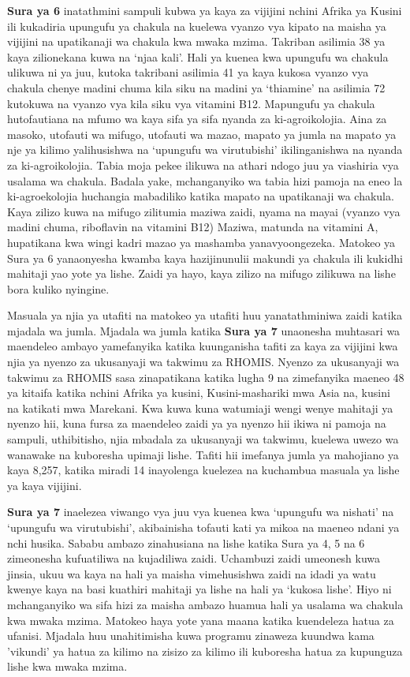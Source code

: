 \textbf{Sura ya 6} inatathmini sampuli kubwa ya kaya za vijijini nchini Afrika ya Kusini ili kukadiria upungufu ya chakula na kuelewa vyanzo vya kipato na maisha ya vijijini na upatikanaji wa chakula kwa mwaka mzima. Takriban asilimia 38 ya kaya zilionekana kuwa na `njaa kali'. Hali ya kuenea kwa upungufu wa chakula ulikuwa ni ya juu, kutoka takribani asilimia 41 ya kaya kukosa vyanzo vya chakula chenye madini chuma kila siku na madini ya `thiamine' na asilimia 72 kutokuwa na vyanzo vya kila siku vya vitamini B12. Mapungufu ya chakula hutofautiana na mfumo wa kaya sifa ya sifa nyanda za ki-agroikolojia. Aina za masoko, utofauti wa mifugo, utofauti wa mazao, mapato ya jumla na mapato ya nje ya kilimo yalihusishwa na `upungufu wa virutubishi' ikilinganishwa na nyanda za ki-agroikolojia. Tabia moja pekee ilikuwa na athari ndogo juu ya viashiria vya usalama wa chakula. Badala yake, mchanganyiko wa tabia hizi pamoja na eneo la ki-agroekolojia huchangia mabadiliko katika mapato na upatikanaji wa chakula. Kaya zilizo kuwa na mifugo zilitumia maziwa zaidi, nyama na mayai (vyanzo vya madini chuma, riboflavin na vitamini B12) Maziwa, matunda na vitamini A, hupatikana kwa wingi kadri mazao ya mashamba yanavyoongezeka. Matokeo ya Sura ya 6 yanaonyesha kwamba kaya hazijinunulii makundi ya chakula ili kukidhi mahitaji yao yote ya lishe. Zaidi ya hayo, kaya zilizo na mifugo zilikuwa na lishe bora kuliko nyingine.

Masuala ya njia ya utafiti na matokeo ya utafiti huu yanatathminiwa zaidi katika mjadala wa jumla. Mjadala wa jumla katika \textbf{Sura ya 7} unaonesha muhtasari wa maendeleo ambayo yamefanyika katika kuunganisha tafiti za kaya za vijijini kwa njia ya nyenzo za ukusanyaji wa takwimu za RHOMIS. Nyenzo za ukusanyaji wa takwimu za RHOMIS sasa zinapatikana katika lugha 9 na zimefanyika maeneo 48 ya kitaifa katika nchini Afrika ya kusini, Kusini-mashariki mwa Asia na, kusini na katikati mwa Marekani. Kwa kuwa kuna watumiaji wengi wenye mahitaji ya nyenzo hii, kuna fursa za maendeleo zaidi ya ya nyenzo hii ikiwa ni pamoja na sampuli, uthibitisho, njia mbadala za ukusanyaji wa takwimu, kuelewa uwezo wa wanawake na kuboresha upimaji lishe. Tafiti hii imefanya jumla ya mahojiano ya kaya 8,257, katika miradi 14 inayolenga kuelezea na kuchambua masuala ya lishe ya kaya vijijini. 

\textbf{Sura ya 7} inaelezea viwango vya juu vya kuenea kwa `upungufu wa nishati' na `upungufu wa virutubishi', akibainisha tofauti kati ya mikoa na maeneo ndani ya nchi husika. Sababu ambazo zinahusiana na lishe katika Sura ya 4, 5 na 6 zimeonesha kufuatiliwa na kujadiliwa zaidi. Uchambuzi zaidi umeonesh kuwa jinsia, ukuu wa kaya na hali ya maisha vimehusishwa zaidi na idadi ya watu kwenye kaya na basi kuathiri mahitaji ya lishe na hali ya `kukosa lishe'. Hiyo ni mchanganyiko wa sifa hizi za maisha ambazo huamua hali ya usalama wa chakula kwa mwaka mzima. Matokeo haya yote yana maana katika kuendeleza hatua za ufanisi. Mjadala huu unahitimisha kuwa programu zinaweza kuundwa kama 'vikundi' ya hatua za kilimo na zisizo za kilimo ili kuboresha hatua za kupunguza lishe kwa mwaka mzima.
